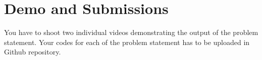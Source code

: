\documentclass{article} %
\newcounter{source}
\begin{document}
\section {Demo and Submissions}
You have to shoot two individual videos demonstrating the output of the problem statement.
Your codes for each of the problem statement has to be uploaded in Github repository.







































%
%


\end{document}

